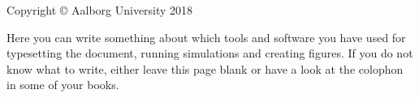 \thispagestyle{empty}
{\small
\strut\vfill %
\noindent Copyright \copyright{} Aalborg University 2018\par
\vspace{0.2cm}
\noindent Here you can write something about which tools and software you have used for typesetting the document, running simulations and creating figures. If you do not know what to write, either leave this page blank or have a look at the colophon in some of your books.
}
\clearpage